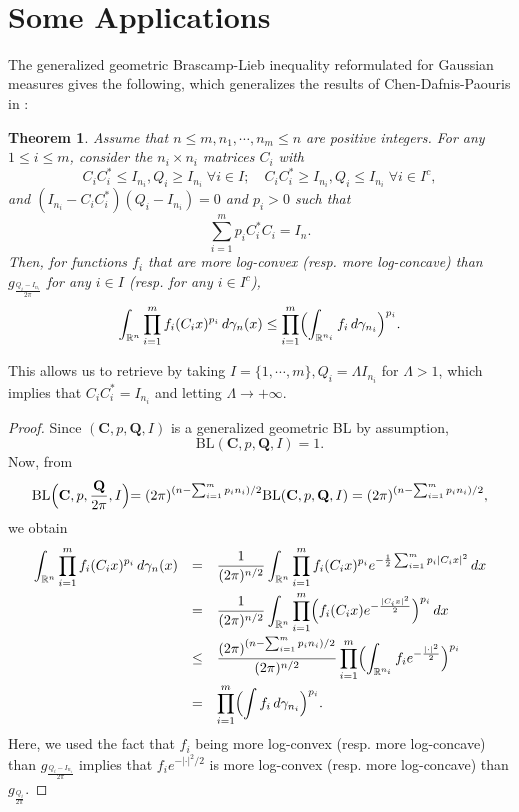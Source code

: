 \documentclass[11pt,a4paper,reqno]{amsart}
\numberwithin{equation}{section}
\newtheorem{theorem}{Theorem}[section]
\theoremstyle{definition}
\newcommand{\nm}{\noalign{\smallskip}}
\newcommand{\ds}{\displaystyle}
\newcommand{\<}{\ensuremath \leq}
\renewcommand{\>}{\ensuremath \geq}
\begin{document}
\hfill \\

\section{Some Applications}

The generalized geometric Brascamp-Lieb inequality reformulated for Gaussian measures gives the following, which generalizes the results of Chen-Dafnis-Paouris in \cite{Chen_Dafnis_Paouris}: 

\begin{theorem}
    Assume that $n \leq m, n_1,\cdots,n_m \leq n$ are positive integers. For any $1 \leq i \leq m$, consider the $n_i \times n_i$ matrices $C_i$ with $$C_iC_i^* \leq I_{n_i}, Q_i \ge I_{n_i} \; \forall i \in I; \quad C_iC_i^* \ge I_{n_i}, Q_i \le I_{n_i} \; \forall i \in I^c, $$ and $(I_{n_i}-C_iC_i^*)(Q_i-I_{n_i})=0$ and $p_i>0$ such that $$\sum_{i=1}^m p_iC_i^*C_i=I_n.$$ Then, for functions $f_i$ that are more log-convex (resp. more log-concave) than $g_{\frac{Q_i-I_{n_i}}{2\pi}}$ for any $i \in I$ (resp. for any $i \in I^c$), $$\int_{\mathbb{R}^n}\prod_{i=1}^m f_i(C_ix)^{p_i}\, d\gamma_n(x) \leq \prod_{i=1}^m \Bigl(\int_{\mathbb{R}^{n_i}}f_i \, d\gamma_{n_i}\Bigl)^{p_i}.$$ 
\end{theorem}


This allows us to retrieve \cite[Theorem 4]{Chen_Dafnis_Paouris} by taking $I=\{1,\cdots,m\}, Q_i=\Lambda I_{n_i}$ for $\Lambda>1$, which implies that $C_iC_i^*=I_{n_i}$ and letting $\Lambda \rightarrow +\infty$. 


\begin{proof}
    Since $(\textbf{C},p,\textbf{Q},I)$ is a generalized geometric BL by assumption, $$\mathrm{BL}(\textbf{C},p,\textbf{Q},I)=1.$$ Now, from $$\mathrm{BL}\Bigl(\textbf{C},p,\frac{\textbf{Q}}{2\pi},I\Bigl)=(2\pi)^{(n-\sum_{i=1}^m p_in_i)/2}\mathrm{BL}(\textbf{C},p,\textbf{Q},I)=(2\pi)^{(n-\sum_{i=1}^m p_in_i)/2},$$
    we obtain
    $$\begin{array}{lll}
        \ds \int_{\mathbb{R}^n} \prod_{i=1}^m f_i(C_ix)^{p_i} \, d\gamma_n(x)  &=& \ds \frac{1}{(2\pi)^{n/2}}\int_{\mathbb{R}^n}\prod_{i=1}^m f_i(C_ix)^{p_i} e^{-\frac{1}{2}\sum_{i=1}^m p_i |C_ix|^2}\, dx  \\
        \nm
        &=& \ds  \frac{1}{(2\pi)^{n/2}}\int_{\mathbb{R}^n}\prod_{i=1}^m \Bigl(f_i(C_ix)e^{-\frac{|C_ix|^2}{2}} \Bigl)^{p_i} \, dx  \\
        \nm 
        &\leq& \ds \frac{(2\pi)^{(n-\sum_{i=1}^m p_in_i)/2}}{(2\pi)^{n/2}}\prod_{i=1}^m \Bigl( \int_{\mathbb{R}^{n_i}}f_i e^{-\frac{|\cdot|^2}{2}} \Bigl)^{p_i} \\
        \nm 
        &=& \ds \prod_{i=1}^m \Bigl( \int f_i \, d\gamma_{n_i}\Bigl)^{p_i}.
    \end{array}$$ Here, we used the fact that $f_i$ being more log-convex (resp. more log-concave) than $g_{\frac{Q_i-I_{n_i}}{2\pi}}$ implies that $f_ie^{-|\cdot|^2/2}$ is more log-convex (resp. more log-concave) than $g_{\frac{Q_i}{2\pi}}.$ 
\end{proof}
\end{document}
